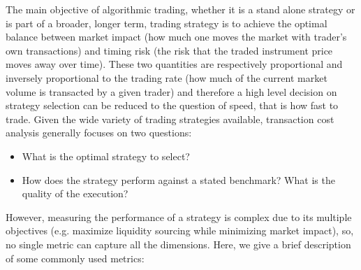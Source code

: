 The main objective of algorithmic trading, whether it is a stand alone strategy or is part of a broader, longer term, trading strategy is to achieve the optimal balance between market impact (how much one moves the market with trader's own transactions) and timing risk (the risk that the traded instrument price moves away over time). These two quantities are respectively proportional and inversely proportional to the trading rate (how much of the current market volume is transacted by a given trader) and therefore a high level decision on strategy selection can be reduced to the question of speed, that is how fast to trade. Given the wide variety of trading strategies available, transaction cost analysis generally focuses on two questions:
\begin{itemize}
\item What is the optimal strategy to select?
\item How does the strategy perform against a stated benchmark? What is the quality of the execution?
\end{itemize}

However, measuring the performance of a strategy is complex due to its multiple objectives (e.g. maximize liquidity sourcing while minimizing market impact), so, no single metric can capture all the dimensions. Here, we give a brief description of some commonly used metrics:

